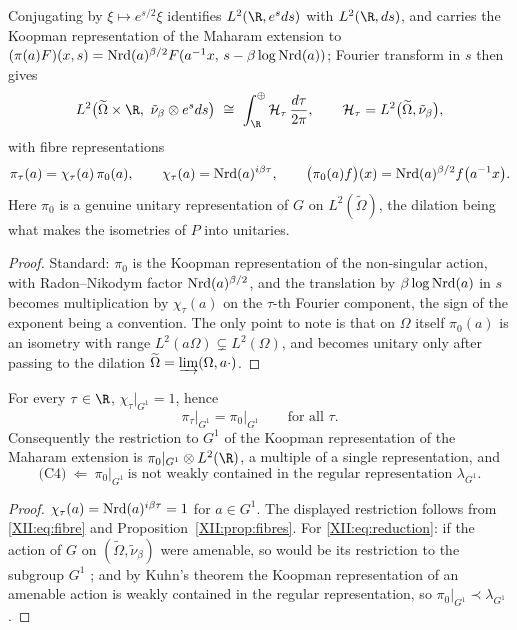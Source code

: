 \begin{proposition}\label{XII:prop:fibres}
Conjugating by $\xi\mapsto e^{s/2}\xi$ identifies $L^2(\R,e^{s}ds)$ with $L^2(\R,ds)$, and
carries the Koopman representation of the Maharam extension to
$(\pi(a)F)(x,s)=\operatorname{Nrd}(a)^{\beta/2}F(a^{-1}x,\,s-\beta\log\operatorname{Nrd}(a))$; Fourier transform in $s$ then
gives
\[
L^2\bigl(\widetilde\Omega\times\R,\ \tilde\nu_\beta\otimes e^{s}ds\bigr)
\ \cong\ \int_\R^\oplus\mathcal H_\tau\,\frac{d\tau}{2\pi},
\qquad
\mathcal H_\tau=L^2\bigl(\widetilde\Omega,\tilde\nu_\beta\bigr),
\]
with fibre representations
\begin{equation}\label{XII:eq:fibre}
\pi_\tau(a)=\chi_\tau(a)\,\pi_0(a),
\qquad
\chi_\tau(a)=\operatorname{Nrd}(a)^{i\beta\tau},
\qquad
\bigl(\pi_0(a)f\bigr)(x)=\operatorname{Nrd}(a)^{\beta/2}f\bigl(a^{-1}x\bigr).
\end{equation}
Here $\pi_0$ is a genuine unitary representation of $G$ on $L^2(\widetilde\Omega)$, the
dilation being what makes the isometries of $P$ into unitaries.
\end{proposition}

\begin{proof}
Standard: $\pi_0$ is the Koopman representation of the non-singular action, with
Radon--Nikodym factor $\operatorname{Nrd}(a)^{\beta/2}$, and the translation by $\beta\log\operatorname{Nrd}(a)$ in $s$
becomes multiplication by $\chi_\tau(a)$ on the $\tau$-th Fourier component, the sign of the
exponent being a convention. The only point to note is that on $\Omega$ itself $\pi_0(a)$ is
an isometry with range $L^2(a\Omega)\subsetneq L^2(\Omega)$, and becomes unitary only after
passing to the dilation $\widetilde\Omega=\varinjlim(\Omega,a\cdot)$.
\end{proof}

\begin{theorem}\label{XII:thm:invisible}
For every $\tau\in\R$, $\chi_\tau|_{G^1}=1$, hence
\[
\pi_\tau\big|_{G^1}=\pi_0\big|_{G^1}\qquad\text{for all }\tau .
\]
Consequently the restriction to $G^1$ of the Koopman representation of the Maharam extension
is $\pi_0|_{G^1}\otimes L^2(\R)$, a multiple of a single representation, and
\begin{equation}\label{XII:eq:reduction}
\text{(C4)}\ \Longleftarrow\ \pi_0\big|_{G^1}\ \text{is not weakly contained in the regular representation }\lambda_{G^1}.
\end{equation}
\end{theorem}

\begin{proof}
$\chi_\tau(a)=\operatorname{Nrd}(a)^{i\beta\tau}=1$ for $a\in G^1$. The displayed restriction follows from
\eqref{XII:eq:fibre} and Proposition~\ref{XII:prop:fibres}. For \eqref{XII:eq:reduction}: if the
action of $G$ on $(\widetilde\Omega,\tilde\nu_\beta)$ were amenable, so would be its
restriction to the subgroup $G^1$ \cite{AD}; and by Kuhn's theorem \cite{Kuhn}
the Koopman representation of an amenable action is weakly contained in the regular
representation, so $\pi_0|_{G^1}\prec\lambda_{G^1}$.
\end{proof}

